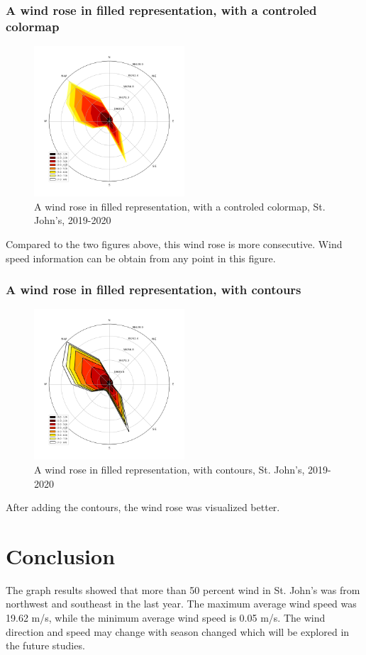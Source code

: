 \documentclass[10pt]{report}
\begin{document}
\subsection{A wind rose in filled representation, with a controled colormap}
 \begin{figure}[h!]
    \centering
    \includegraphics[width=0.50\textwidth]{images/figure4.png}
    \caption{A wind rose in filled representation, with a controled colormap, St. John's, 2019-2020}
    \label{fig: PaleBlueDot}    
\end{figure}
Compared to the two figures above, this wind rose is more consecutive. Wind speed information can be obtain from any point in this figure.

\subsection{A wind rose in filled representation, with contours}
 \begin{figure}[h!]
    \centering
    \includegraphics[width=0.50\textwidth]{images/figure5.png}
    \caption{A wind rose in filled representation, with contours, St. John's, 2019-2020}
    \label{fig: PaleBlueDot}    
\end{figure}
After adding the contours, the wind rose was visualized better.
 
 \chapter{Conclusion}
 The graph results showed that more than 50 percent wind in St. John's was from northwest and southeast in the last year. The maximum average wind speed was 19.62 m/s, while the minimum average wind speed is 0.05 m/s. The wind direction and speed may change with season changed which will be explored in the future studies.

\printbibliography
\end{document}
